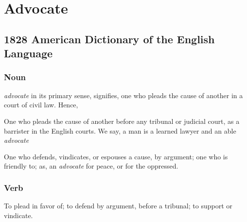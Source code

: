 \section{Advocate}
	\label{ADVOCATE}
	

\subsection{1828 American Dictionary of the English Language} %
	\label{ADVOCATE-1828}
	
	\subsubsection{Noun}

		\begin{compactitem}
			\item[1] \textit{advocate} in its primary sense, signifies, one who pleads the cause of another in a court of civil law. Hence,
			\item[2] One who pleads the cause of another before any tribunal or judicial court, as a barrister in the English courts. We say, a man is a learned lawyer and an able \textit{advocate}
			\item[3] One who defends, vindicates, or espouses a cause, by argument; one who is friendly to; as, an \textit{advocate} for peace, or for the oppressed.
		\end{compactitem}
		
	\subsubsection{Verb}

		\begin{compactitem}
			\item To plead in favor of; to defend by argument, before a tribunal; to support or vindicate.
		\end{compactitem}


